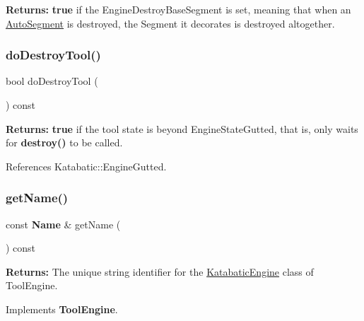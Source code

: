 {\bfseries Returns\+:} {\bfseries true} if the Engine\+Destroy\+Base\+Segment is set, meaning that when an \mbox{\hyperlink{classKatabatic_1_1AutoSegment}{Auto\+Segment}} is destroyed, the Segment it decorates is destroyed altogether. \mbox{\label{classKatabatic_1_1KatabaticEngine_a867e6dbfea5e5895a01ef71c66398b26}} 
\subsubsection{\texorpdfstring{do\+Destroy\+Tool()}{doDestroyTool()}}
{\footnotesize\ttfamily bool do\+Destroy\+Tool (\begin{DoxyParamCaption}{ }\end{DoxyParamCaption}) const\hspace{0.3cm}{\ttfamily [inline]}}

{\bfseries Returns\+:} {\bfseries true} if the tool state is beyond Engine\+State\+Gutted, that is, only waits for {\ttfamily \textbf{ destroy()}} to be called. 

References Katabatic\+::\+Engine\+Gutted.

\mbox{\label{classKatabatic_1_1KatabaticEngine_a9e76ae5cee9320b65251387419c9432b}} 
\subsubsection{\texorpdfstring{get\+Name()}{getName()}}
{\footnotesize\ttfamily const \textbf{ Name} \& get\+Name (\begin{DoxyParamCaption}{ }\end{DoxyParamCaption}) const\hspace{0.3cm}{\ttfamily [virtual]}}

{\bfseries Returns\+:} The unique string identifier for the \mbox{\hyperlink{classKatabatic_1_1KatabaticEngine}{Katabatic\+Engine}} class of Tool\+Engine. 

Implements \textbf{ Tool\+Engine}.

